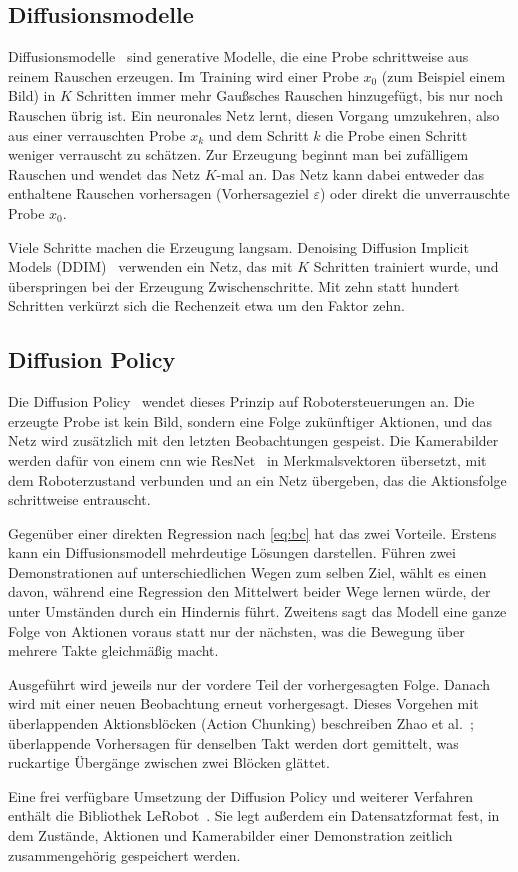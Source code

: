 \subsection{Diffusionsmodelle}

Diffusionsmodelle~\cite{ho2020} sind generative Modelle, die eine Probe schrittweise aus
reinem Rauschen erzeugen. Im Training wird einer Probe $x_0$ (zum Beispiel einem Bild) in
$K$ Schritten immer mehr Gaußsches Rauschen hinzugefügt, bis nur noch Rauschen übrig ist.
Ein neuronales Netz lernt, diesen Vorgang umzukehren, also aus einer verrauschten Probe
$x_k$ und dem Schritt $k$ die Probe einen Schritt weniger verrauscht zu schätzen. Zur
Erzeugung beginnt man bei zufälligem Rauschen und wendet das Netz $K$-mal an. Das Netz kann
dabei entweder das enthaltene Rauschen vorhersagen (Vorhersageziel $\varepsilon$) oder
direkt die unverrauschte Probe $x_0$.

Viele Schritte machen die Erzeugung langsam. Denoising Diffusion Implicit Models
(DDIM)~\cite{song2021} verwenden ein Netz, das mit $K$ Schritten trainiert wurde, und
überspringen bei der Erzeugung Zwischenschritte. Mit zehn statt hundert Schritten verkürzt
sich die Rechenzeit etwa um den Faktor zehn.

\subsection{Diffusion Policy}
\label{sec:diffusion-policy}

Die Diffusion Policy~\cite{chi2024} wendet dieses Prinzip auf Robotersteuerungen an. Die
erzeugte Probe ist kein Bild, sondern eine Folge zukünftiger Aktionen, und das Netz wird
zusätzlich mit den letzten Beobachtungen gespeist. Die Kamerabilder werden dafür von einem
\ac{cnn} wie ResNet~\cite{he2016} in Merkmalsvektoren übersetzt, mit dem Roboterzustand
verbunden und an ein Netz übergeben, das die Aktionsfolge schrittweise entrauscht.

Gegenüber einer direkten Regression nach \cref{eq:bc} hat das zwei Vorteile. Erstens kann
ein Diffusionsmodell mehrdeutige Lösungen darstellen. Führen zwei Demonstrationen auf
unterschiedlichen Wegen zum selben Ziel, wählt es einen davon, während eine Regression
den Mittelwert beider Wege lernen würde, der unter Umständen durch ein Hindernis führt.
Zweitens sagt das Modell eine ganze Folge von Aktionen voraus statt nur der nächsten, was
die Bewegung über mehrere Takte gleichmäßig macht.

Ausgeführt wird jeweils nur der vordere Teil der vorhergesagten Folge. Danach wird mit einer
neuen Beobachtung erneut vorhergesagt. Dieses Vorgehen mit überlappenden
Aktionsblöcken (Action Chunking) beschreiben Zhao et al.~\cite{zhao2023}; überlappende
Vorhersagen für denselben Takt werden dort gemittelt, was ruckartige Übergänge zwischen
zwei Blöcken glättet.

Eine frei verfügbare Umsetzung der Diffusion Policy und weiterer Verfahren enthält die
Bibliothek LeRobot~\cite{lerobot}. Sie legt außerdem ein Datensatzformat fest, in dem
Zustände, Aktionen und Kamerabilder einer Demonstration zeitlich zusammengehörig gespeichert
werden.
